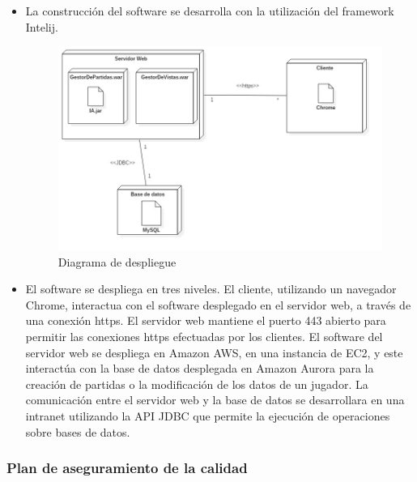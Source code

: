 \begin{itemize}
\item { La construcción del software se desarrolla con la utilización del framework Intelij.}
\begin{figure}[H]
\centering
\includegraphics[scale = 0.4]{figuras/despliegue.jpg}
\caption{Diagrama de despliegue}
\label{fig:diagramaDespliegue}
\end{figure}

\item{ El software se despliega en tres niveles. El cliente, utilizando un navegador Chrome, interactua con el software desplegado en el servidor web, a través de una conexión https. El servidor web mantiene  el puerto 443 abierto para permitir las conexiones https efectuadas por los clientes. El software del servidor web se despliega en Amazon AWS, en una instancia de EC2, y este interactúa con la base de datos desplegada en Amazon Aurora para la creación de partidas o la modificación de los datos de un jugador. La comunicación entre el servidor web y la base de datos se desarrollara en una intranet utilizando la API JDBC que permite la ejecución de operaciones sobre bases de datos.}
\end{itemize}

\subsubsection{Plan de aseguramiento de la calidad}

